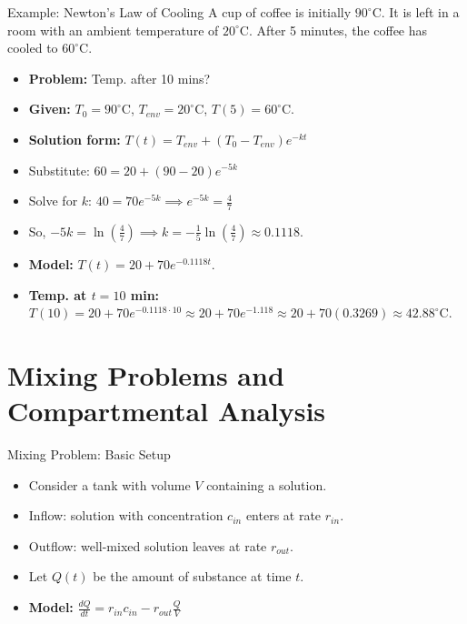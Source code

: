 \documentclass[10pt,aspectratio=169]{beamer}
\begin{document}
\begin{frame}{Example: Newton's Law of Cooling}
    A cup of coffee is initially $90^{\circ}\text{C}$. It is left in a room with an ambient temperature of $20^{\circ}\text{C}$. After 5 minutes, the coffee has cooled to $60^{\circ}\text{C}$.
    \begin{itemize}
        \item \textbf{Problem:} Temp. after 10 mins?
        \item \textbf{Given:} $T_0 = 90^{\circ}\text{C}$, $T_{env} = 20^{\circ}\text{C}$, $T(5) = 60^{\circ}\text{C}$.
        \item \textbf{Solution form:} $T(t) = T_{env} + (T_0 - T_{env})e^{-kt}$
        \item Substitute: $60 = 20 + (90 - 20)e^{-5k}$
        \item Solve for $k$: $40 = 70e^{-5k} \implies e^{-5k} = \frac{4}{7}$
        \item So, $-5k = \ln\left(\frac{4}{7}\right) \implies k = -\frac{1}{5}\ln\left(\frac{4}{7}\right) \approx 0.1118$.
        \item \textbf{Model:} $T(t) = 20 + 70e^{-0.1118t}$.
        \item \textbf{Temp. at $t=10$ min:} $T(10) = 20 + 70e^{-0.1118 \cdot 10} \approx 20 + 70e^{-1.118} \approx 20 + 70(0.3269) \approx 42.88^{\circ}\text{C}$.
    \end{itemize}
\end{frame}

\section{Mixing Problems and Compartmental Analysis}
\begin{frame}{Mixing Problem: Basic Setup}
    \begin{itemize}
        \item Consider a tank with volume $V$ containing a solution.
        \item Inflow: solution with concentration $c_{in}$ enters at rate $r_{in}$.
        \item Outflow: well-mixed solution leaves at rate $r_{out}$.
        \item Let $Q(t)$ be the amount of substance at time $t$.
        \item \textbf{Model:} $\frac{dQ}{dt} = r_{in}c_{in} - r_{out}\frac{Q}{V}$
    \end{itemize}
\end{frame}
\end{document}
